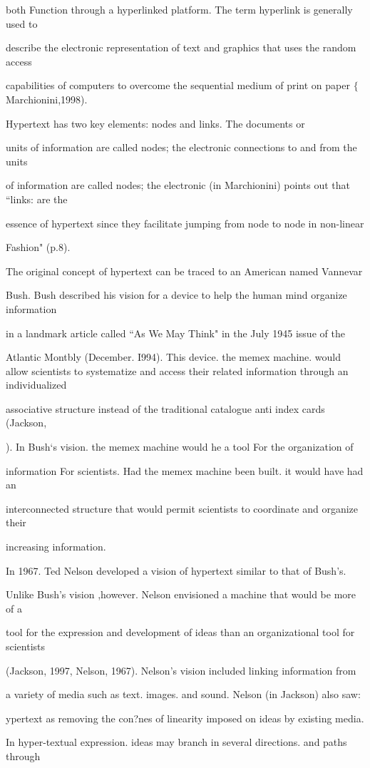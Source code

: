 \documentclass{book}
\begin{document}
\begin{flushleft}
\noindent both Function through a hyperlinked platform. The term hyperlink is generally used to

\noindent describe the electronic representation of text and graphics that uses the random access

\noindent capabilities of computers to overcome the sequential medium of print on paper $\mathrm{\{}$Marchionini,1998).

\noindent Hypertext has two key elements: nodes and links. The documents or

\noindent units of information are called nodes; the electronic connections to and from the units

\noindent of information are called nodes; the electronic (in Marchionini) points out that ``links: are the

\noindent essence of hypertext since they facilitate jumping from node to node in non-linear

\noindent Fashion" (p.8).

\noindent      The original concept of hypertext can be traced to an American named Vannevar

\noindent Bush. Bush described his vision for a device to help the human mind organize information

\noindent in a landmark article called ``As We May Think" in the July 1945 issue of the

\noindent Atlantic Montbly (December. I994). This device. the memex machine. would allow scientists to systematize and access their related information through an individualized

\noindent associative structure instead of the traditional catalogue anti index cards (Jackson,

). In Bush`s vision. the memex machine would he a tool For the organization of

\noindent information For scientists. Had the memex machine been built. it would have had an

\noindent interconnected structure that would permit scientists to coordinate and organize their

\noindent increasing information.

\noindent      In 1967. Ted Nelson developed a vision of hypertext similar to that of Bush's.

\noindent Unlike Bush's vision ,however. Nelson envisioned a machine that would be more of a

\noindent tool for the expression and development of ideas than an organizational tool for scientists

\noindent (Jackson, 1997, Nelson, 1967). Nelson's vision included linking information from

\noindent a variety of media such as text. images. and sound. Nelson (in Jackson) also saw:

\noindent 

\noindent [H]ypertext as removing the con?nes of linearity imposed on ideas by existing media.

\noindent In hyper-textual expression. ideas may branch in several directions. and paths through
\end{flushleft}
\end{document}
